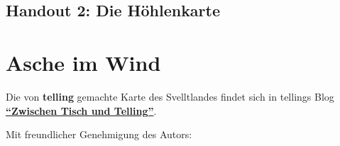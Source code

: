 \documentclass[openright]{Ilaris}
\begin{document}
\vfill

\subsection*{Handout 2: Die Höhlenkarte}
\label{kuh_ho2}

\bigskip
\begin{center}
\end{center}







\section{Asche im Wind}

Die von \textbf{telling} gemachte Karte des Svelltlandes findet sich in tellings Blog \href{https://tellingaventurien.home.blog/2023/02/27/karte-svelltland-um-1045-nach-bosparans-fall/}{\textbf{\enquote{Zwischen Tisch und Telling}}}.

Mit freundlicher Genehmigung des Autors:
\end{document}
